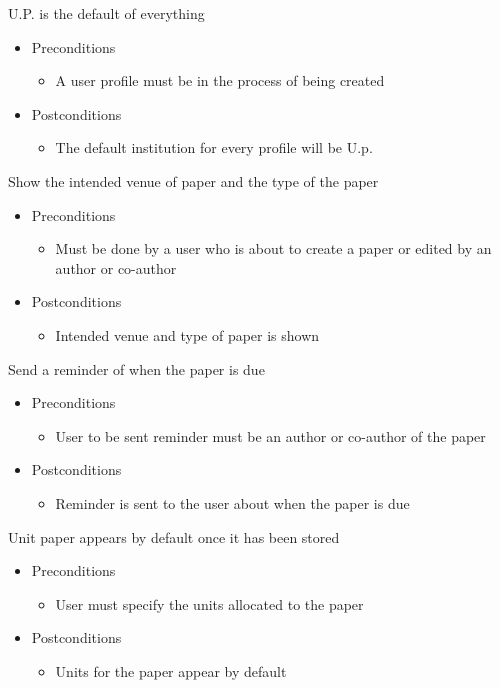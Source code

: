 \documentclass[a4paper,12pt]{article}
\begin{document}
U.P. is the default of everything
\begin{itemize}
    \item Preconditions
    \begin{itemize}
        \item A user profile must be in the process of being created
    \end{itemize}
    \item Postconditions
    \begin{itemize}
        \item The default institution for every profile will be U.p.
    \end{itemize}
\end{itemize}
Show the intended venue of paper and the type of the paper
\begin{itemize}
    \item Preconditions
    \begin{itemize}
        \item Must be done by a user who is about to create a paper or edited by an author or co-author
    \end{itemize}
    \item Postconditions
    \begin{itemize}
        \item Intended venue and type of paper is shown
    \end{itemize}

\end{itemize}
Send a reminder of when the paper is due
\begin{itemize}
    \item Preconditions
    \begin{itemize}
        \item User to be sent reminder must be an author or co-author of the paper
    \end{itemize}
    \item Postconditions
    \begin{itemize}
        \item Reminder is sent to the user about when the paper is due
    \end{itemize}
\end{itemize}
Unit paper appears by default once it has been stored
\begin{itemize}
    \item Preconditions
    \begin{itemize}
        \item User must specify the units allocated to the paper
    \end{itemize}
    \item Postconditions
    \begin{itemize}
        \item Units for the paper appear by default
    \end{itemize}
\end{itemize}
\end{document}
